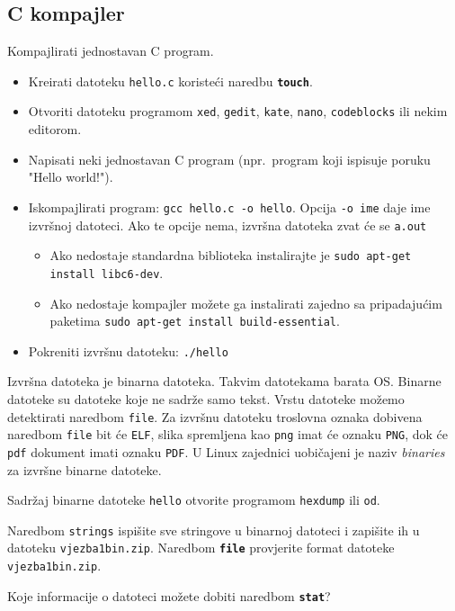 \subsection*{C kompajler}
\begin{zadatak}
Kompajlirati jednostavan C program. 
\begin{itemize}
 \item Kreirati datoteku \texttt{hello.c} koristeći naredbu \textbf{\texttt{touch}}.
 \item Otvoriti datoteku programom \texttt{xed}, \texttt{gedit}, \texttt{kate}, \texttt{nano}, \texttt{codeblocks} ili nekim editorom.
 \item Napisati neki jednostavan C program (npr.~program koji ispisuje poruku "Hello world!").
\item Iskompajlirati program: \texttt{gcc hello.c -o hello}. Opcija \lstinline!-o ime! daje ime izvršnoj datoteci. Ako te opcije nema, izvršna datoteka zvat će se \lstinline!a.out! 
\begin{itemize}
\item Ako nedostaje standardna biblioteka instalirajte je \texttt{sudo apt-get install libc6-dev}.
\item Ako nedostaje kompajler možete ga instalirati zajedno  sa pripadajućim paketima \texttt{sudo apt-get install build-essential}.                                                                                                                                                                                                                                                                                    \end{itemize}
\item Pokreniti izvršnu datoteku: \texttt{./hello}
\end{itemize}
\end{zadatak}

Izvršna datoteka je binarna datoteka. Takvim datotekama barata OS. Binarne datoteke su datoteke koje ne sadrže samo tekst. Vrstu datoteke možemo detektirati naredbom \lstinline!file!. Za izvršnu datoteku troslovna oznaka dobivena naredbom \lstinline!file! bit će \lstinline!ELF!, slika spremljena kao \lstinline!png! imat će oznaku \lstinline!PNG!, dok će \lstinline!pdf! dokument imati oznaku \lstinline!PDF!. U Linux zajednici uobičajeni je naziv \textit{binaries} za izvršne binarne datoteke. 
\begin{zadatak}
Sadržaj binarne datoteke \texttt{hello} otvorite programom \texttt{hexdump} ili \texttt{od}.
\end{zadatak}
\begin{zadatak}
Naredbom \texttt{strings} ispišite sve stringove u binarnoj datoteci i zapišite ih u datoteku \texttt{vjezba1bin.zip}. Naredbom \textbf{\texttt{file}} provjerite format datoteke \texttt{vjezba1bin.zip}. 
\end{zadatak}
\begin{zadatak}
Koje informacije o datoteci možete dobiti naredbom \textbf{\texttt{stat}}?
\end{zadatak}

